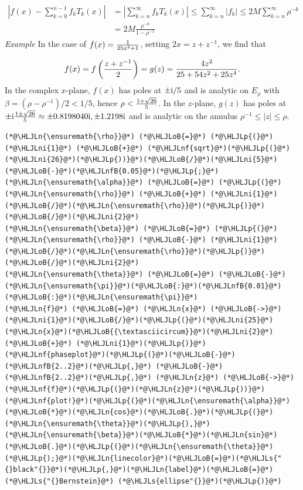 \documentclass[12pt,a4paper]{article}
\newcommand{\HLJLn}[1]{#1}
\newcommand{\HLJLnf}[1]{\textcolor[RGB]{66,102,213}{#1}}
\newcommand{\HLJLs}[1]{\textcolor[RGB]{201,61,57}{#1}}
\newcommand{\HLJLnfB}[1]{\textcolor[RGB]{59,151,46}{#1}}
\newcommand{\HLJLni}[1]{\textcolor[RGB]{59,151,46}{#1}}
\newcommand{\HLJLoB}[1]{\textcolor[RGB]{102,102,102}{\textbf{#1}}}
\newcommand{\HLJLp}[1]{#1}
\begin{document}
\begin{align*}
\left \vert f(x) -   \sum_{k = 0}^{n-1}f_kT_k(x) \right\vert & = \left \vert  \sum_{k = n}^{\infty}f_kT_k(x) \right\vert \leq \sum_{k = n}^{\infty}\vert f_k \vert \leq 2M \sum_{k = n}^{\infty} \rho^{-k}\\
& = 2M \frac{\rho^{-n}}{1 - \rho^{-1}}
\end{align*}
\emph{Example}  In the case of $f(x) = {1 \over 25 x^2 + 1}$, setting $2x = z + z^{-1}$, we find that

\[
f(x) = f\left( {z+z^{-1} \over 2 } \right) = g(z) = {4 z^2 \over 25 + 54 z^2 + 25 z^4}.
\]
In the complex $x$-plane, $f(x)$ has poles at $\pm {\rm i}/5$ and is analytic on $E_{\rho}$ with $\beta = (\rho - \rho^{-1})/2 < 1/5$, hence $\rho < { 1 + \sqrt{26} \over 5 }$. In the $z$-plane, $g(z)$ has poles at $\pm {\rm i} { 1 \pm \sqrt{26} \over 5 } \approx \pm 0.8198040{\rm i},\pm1.2198{\rm i}$ and is analytic on the annulus $\rho^{-1} \leq \vert z \vert \leq \rho$.


\begin{lstlisting}
(*@\HLJLn{\ensuremath{\rho}}@*) (*@\HLJLoB{=}@*) (*@\HLJLp{(}@*)(*@\HLJLni{1}@*) (*@\HLJLoB{+}@*) (*@\HLJLnf{sqrt}@*)(*@\HLJLp{(}@*)(*@\HLJLni{26}@*)(*@\HLJLp{))}@*)(*@\HLJLoB{/}@*)(*@\HLJLni{5}@*)(*@\HLJLoB{-}@*)(*@\HLJLnfB{0.05}@*)(*@\HLJLp{;}@*)
(*@\HLJLn{\ensuremath{\alpha}}@*) (*@\HLJLoB{=}@*) (*@\HLJLp{(}@*)(*@\HLJLn{\ensuremath{\rho}}@*) (*@\HLJLoB{+}@*) (*@\HLJLni{1}@*)(*@\HLJLoB{/}@*)(*@\HLJLn{\ensuremath{\rho}}@*)(*@\HLJLp{)}@*)(*@\HLJLoB{/}@*)(*@\HLJLni{2}@*)
(*@\HLJLn{\ensuremath{\beta}}@*) (*@\HLJLoB{=}@*) (*@\HLJLp{(}@*)(*@\HLJLn{\ensuremath{\rho}}@*) (*@\HLJLoB{-}@*) (*@\HLJLni{1}@*)(*@\HLJLoB{/}@*)(*@\HLJLn{\ensuremath{\rho}}@*)(*@\HLJLp{)}@*)(*@\HLJLoB{/}@*)(*@\HLJLni{2}@*)
(*@\HLJLn{\ensuremath{\theta}}@*) (*@\HLJLoB{=}@*) (*@\HLJLoB{-}@*)(*@\HLJLn{\ensuremath{\pi}}@*)(*@\HLJLoB{:}@*)(*@\HLJLnfB{0.01}@*)(*@\HLJLoB{:}@*)(*@\HLJLn{\ensuremath{\pi}}@*)
(*@\HLJLn{f}@*) (*@\HLJLoB{=}@*) (*@\HLJLn{x}@*) (*@\HLJLoB{->}@*) (*@\HLJLni{1}@*)(*@\HLJLoB{/}@*)(*@\HLJLp{(}@*)(*@\HLJLni{25}@*)(*@\HLJLn{x}@*)(*@\HLJLoB{{\textasciicircum}}@*)(*@\HLJLni{2}@*) (*@\HLJLoB{+}@*) (*@\HLJLni{1}@*)(*@\HLJLp{)}@*)
(*@\HLJLnf{phaseplot}@*)(*@\HLJLp{(}@*)(*@\HLJLoB{-}@*)(*@\HLJLnfB{2..2}@*)(*@\HLJLp{,}@*) (*@\HLJLoB{-}@*)(*@\HLJLnfB{2..2}@*)(*@\HLJLp{,}@*) (*@\HLJLn{z}@*) (*@\HLJLoB{->}@*) (*@\HLJLnf{f}@*)(*@\HLJLp{(}@*)(*@\HLJLn{z}@*)(*@\HLJLp{))}@*)
(*@\HLJLnf{plot!}@*)(*@\HLJLp{(}@*)(*@\HLJLn{\ensuremath{\alpha}}@*)(*@\HLJLoB{*}@*)(*@\HLJLn{cos}@*)(*@\HLJLoB{.}@*)(*@\HLJLp{(}@*)(*@\HLJLn{\ensuremath{\theta}}@*)(*@\HLJLp{),}@*)(*@\HLJLn{\ensuremath{\beta}}@*)(*@\HLJLoB{*}@*)(*@\HLJLn{sin}@*)(*@\HLJLoB{.}@*)(*@\HLJLp{(}@*)(*@\HLJLn{\ensuremath{\theta}}@*)(*@\HLJLp{);}@*)(*@\HLJLn{linecolor}@*)(*@\HLJLoB{=}@*)(*@\HLJLs{"{}black"{}}@*)(*@\HLJLp{,}@*)(*@\HLJLn{label}@*)(*@\HLJLoB{=}@*)(*@\HLJLs{"{}Bernstein}@*) (*@\HLJLs{ellipse"{}}@*)(*@\HLJLp{)}@*)
\end{lstlisting}
\end{document}
